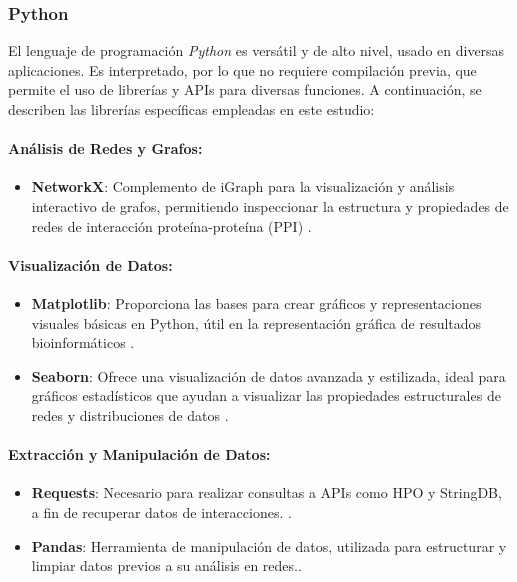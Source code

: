 \subsubsection{Python}
El lenguaje de programación \textit{Python} es versátil y de alto nivel, usado en diversas aplicaciones.  Es interpretado, por lo que no requiere compilación previa, que permite el uso de librerías y APIs para diversas funciones. A continuación, se describen las librerías específicas empleadas en este estudio:

\paragraph{Análisis de Redes y Grafos:}
\begin{itemize}
	\item \textbf{NetworkX}: Complemento de iGraph para la visualización y análisis interactivo de grafos, permitiendo inspeccionar la estructura y propiedades de redes de interacción proteína-proteína (PPI) \cite{hagberg2008}.
\end{itemize}

\paragraph{Visualización de Datos:}
\begin{itemize}
	\item \textbf{Matplotlib}: Proporciona las bases para crear gráficos y representaciones visuales básicas en Python, útil en la representación gráfica de resultados bioinformáticos \cite{Hunter2007}.
	\item \textbf{Seaborn}: Ofrece una visualización de datos avanzada y estilizada, ideal para gráficos estadísticos que ayudan a visualizar las propiedades estructurales de redes y distribuciones de datos \cite{Waskom2021}.
\end{itemize}

\paragraph{Extracción y Manipulación de Datos:}
\begin{itemize}
	\item \textbf{Requests}: Necesario para realizar consultas a APIs como HPO y StringDB, a fin de recuperar datos de interacciones. \cite{Requests2020}.
	\item \textbf{Pandas}: Herramienta de manipulación de datos, utilizada para estructurar y limpiar datos previos a su análisis en redes.\cite{McKinney2010}.
\end{itemize}




